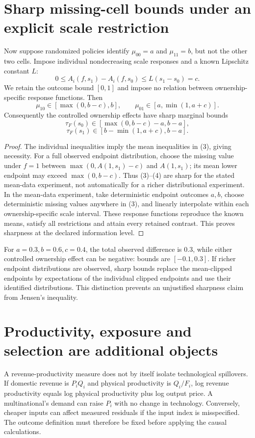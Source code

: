 \documentclass[11pt,a4paper]{article}
\begin{document}
\section{Sharp missing-cell bounds under an explicit scale restriction}
Now suppose randomized policies identify $\mu_{00}=a$ and $\mu_{11}=b$, but not the other two cells. Impose individual nondecreasing scale responses and a known Lipschitz constant $L$:
\[
 0\le A_i(f,s_1)-A_i(f,s_0)\le L(s_1-s_0)=c.
\]
We retain the outcome bound $[0,1]$ and impose no relation between ownership-specific response functions. Then
\[
 \mu_{10}\in[\max(0,b-c),b],\qquad
 \mu_{01}\in[a,\min(1,a+c)]. \tag{3}
\]
Consequently the controlled ownership effects have sharp marginal bounds
\[
 \tau_F(s_0)\in[\max(0,b-c)-a,b-a],
\]
\[
 \tau_F(s_1)\in[b-\min(1,a+c),b-a]. \tag{4}
\]
\begin{proof}
The individual inequalities imply the mean inequalities in (3), giving necessity. For a full observed endpoint distribution, choose the missing value under $f=1$ between $\max(0,A(1,s_1)-c)$ and $A(1,s_1)$; its mean lower endpoint may exceed $\max(0,b-c)$. Thus (3)--(4) are sharp for the stated mean-data experiment, not automatically for a richer distributional experiment. In the mean-data experiment, take deterministic endpoint outcomes $a,b$, choose deterministic missing values anywhere in (3), and linearly interpolate within each ownership-specific scale interval. These response functions reproduce the known means, satisfy all restrictions and attain every retained contrast. This proves sharpness at the declared information level.
\end{proof}

For $a=0.3,b=0.6,c=0.4$, the total observed difference is $0.3$, while either controlled ownership effect can be negative: bounds are $[-0.1,0.3]$. If richer endpoint distributions are observed, sharp bounds replace the mean-clipped endpoints by expectations of the individual clipped endpoints and use their identified distributions. This distinction prevents an unjustified sharpness claim from Jensen's inequality.

\section{Productivity, exposure and selection are additional objects}
A revenue-productivity measure does not by itself isolate technological spillovers. If domestic revenue is $P_iQ_i$ and physical productivity is $Q_i/F_i$, log revenue productivity equals log physical productivity plus log output price. A multinational's demand can raise $P_i$ with no change in technology. Conversely, cheaper inputs can affect measured residuals if the input index is misspecified. The outcome definition must therefore be fixed before applying the causal calculations.
\end{document}
